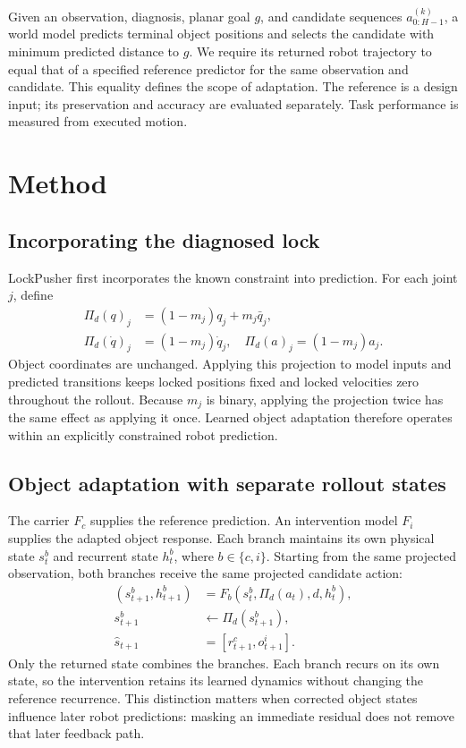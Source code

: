 \documentclass[conference]{IEEEtran}
\begin{document}
Given an observation, diagnosis, planar goal $g$, and candidate sequences $a^{(k)}_{0:H-1}$, a world model predicts terminal object positions and selects the candidate with minimum predicted distance to $g$. We require its returned robot trajectory to equal that of a specified reference predictor for the same observation and candidate. This equality defines the scope of adaptation. The reference is a design input; its preservation and accuracy are evaluated separately. Task performance is measured from executed motion.

\section{Method}
\subsection{Incorporating the diagnosed lock}
LockPusher first incorporates the known constraint into prediction. For each joint $j$, define
\begin{align}
\Pi_d(q)_j&=(1-m_j)q_j+m_j\bar q_j,\\
\Pi_d(\dot q)_j&=(1-m_j)\dot q_j,\quad
\Pi_d(a)_j=(1-m_j)a_j.
\end{align}
Object coordinates are unchanged. Applying this projection to model inputs and predicted transitions keeps locked positions fixed and locked velocities zero throughout the rollout. Because $m_j$ is binary, applying the projection twice has the same effect as applying it once. Learned object adaptation therefore operates within an explicitly constrained robot prediction.

\subsection{Object adaptation with separate rollout states}
The carrier $F_c$ supplies the reference prediction. An intervention model $F_i$ supplies the adapted object response. Each branch maintains its own physical state $s^b_t$ and recurrent state $h^b_t$, where $b\in\{c,i\}$. Starting from the same projected observation, both branches receive the same projected candidate action:
\begin{align}
(s^b_{t+1},h^b_{t+1})&=F_b(s^b_t,\Pi_d(a_t),d,h^b_t),\\
s^b_{t+1}&\leftarrow\Pi_d(s^b_{t+1}),\\
\hat s_{t+1}&=[r^c_{t+1},o^i_{t+1}].\label{eq:publish}
\end{align}
Only the returned state combines the branches. Each branch recurs on its own state, so the intervention retains its learned dynamics without changing the reference recurrence. This distinction matters when corrected object states influence later robot predictions: masking an immediate residual does not remove that later feedback path.
\end{document}
